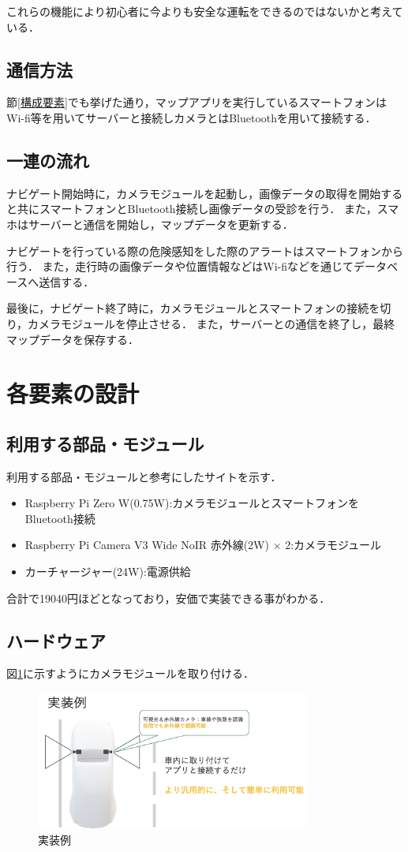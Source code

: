 \documentclass[titlepage,a4paper]{jsarticle}
\begin{document}
これらの機能により初心者に今よりも安全な運転をできるのではないかと考えている．
\subsection{通信方法}
節\ref{構成要素}でも挙げた通り，マップアプリを実行しているスマートフォンはWi-fi等を用いてサーバーと接続しカメラとはBluetoothを用いて接続する．
\subsection{一連の流れ}
ナビゲート開始時に，カメラモジュールを起動し，画像データの取得を開始すると共にスマートフォンとBluetooth接続し画像データの受診を行う．
また，スマホはサーバーと通信を開始し，マップデータを更新する．

ナビゲートを行っている際の危険感知をした際のアラートはスマートフォンから行う．
また，走行時の画像データや位置情報などはWi-fiなどを通じてデータベースへ送信する．

最後に，ナビゲート終了時に，カメラモジュールとスマートフォンの接続を切り，カメラモジュールを停止させる．
また，サーバーとの通信を終了し，最終マップデータを保存する．
\section{各要素の設計}
\subsection{利用する部品・モジュール}
利用する部品・モジュールと参考にしたサイトを示す．
\begin{itemize}
  \item Raspberry Pi Zero W(0.75W)\cite{ラズパイ}:カメラモジュールとスマートフォンをBluetooth接続
  \item Raspberry Pi Camera V3 Wide NoIR 赤外線(2W)\cite{ラズパイ} $\times$ 2:カメラモジュール
  \item カーチャージャー(24W)\cite{カーチャージャー}:電源供給
\end{itemize}
合計で19040円ほどとなっており，安価で実装できる事がわかる．
\subsection{ハードウェア}
図\ref{ハードウェア}に示すようにカメラモジュールを取り付ける．
\begin{figure}[H]
  \centering
  \includegraphics[width=0.8\textwidth]{img/hardware.png}
  \caption{実装例}
  \label{ハードウェア}
\end{figure}
\end{document}
